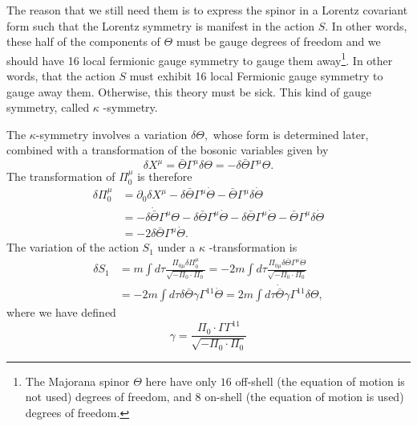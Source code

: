 \documentclass[graybox,envcountchap,sectrefs]{svmono}
\begin{document}
The reason that we still need them is to express the spinor in a Lorentz covariant form such that the Lorentz symmetry is manifest in the action $S$. In other words, these half of the components of $\Theta$ must be gauge degrees of freedom and we should have 16 local fermionic gauge symmetry to gauge them away\footnote{The Majorana spinor $\Theta$ here have only $16$ off-shell (the equation of motion is not used) degrees of freedom, and $8$ on-shell (the equation of motion is used) degrees of freedom.}. 
In other words, that the action $S$ must exhibit 16 local Fermionic gauge symmetry to gauge away them. Otherwise, this theory must be sick.
This kind of gauge symmetry, called $\kappa$ -symmetry.


The $\kappa$-symmetry involves a variation $\delta \Theta,$ whose form is determined later, combined with a transformation of the bosonic variables given by
\begin{equation}
\delta X^{\mu}=\bar{\Theta} \Gamma^{\mu} \delta \Theta=-\delta \bar{\Theta} \Gamma^{\mu} \Theta.
\end{equation}
The transformation of $\Pi_{0}^{\mu}$ is therefore
\begin{equation}
\begin{aligned}
\delta \Pi_{0}^{\mu} &=\partial_{0} \delta X^{\mu}-\delta \bar{\Theta} \Gamma^{\mu} \dot{\Theta}-\bar{\Theta} \Gamma^{\mu} \delta \dot{\Theta} \\
&=-\delta \dot{\bar{\Theta}} \Gamma^{\mu} \Theta-\delta \bar{\Theta} \Gamma^{\mu} \dot{\Theta}-\delta \bar{\Theta} \Gamma^{\mu} \dot{\Theta}-\bar{\Theta} \Gamma^{\mu} \delta \dot{\Theta} \\
&=-2 \delta \bar{\Theta} \Gamma^{\mu} \dot{\Theta}.
\end{aligned}
\end{equation}
The variation of the action $S_{1}$ under a $\kappa$ -transformation is
\begin{equation}
\begin{aligned}
\delta S_{1} &=m \int d \tau \frac{\Pi_{0 \mu} \delta \Pi_{0}^{\mu}}{\sqrt{-\Pi_{0} \cdot \Pi_{0}}}=-2 m \int d \tau \frac{\Pi_{0 \mu} \delta \bar{\Theta} \Gamma^{\mu} \dot{\Theta}}{\sqrt{-\Pi_{0} \cdot \Pi_{0}}} \\
&=-2 m \int d \tau \delta \bar{\Theta} \gamma \Gamma^{11} \dot{\Theta}=2m\int d\tau \dot{\bar{\Theta}}\gamma \Gamma^{11}\delta\Theta,
\end{aligned}
\end{equation}
where we have defined
\begin{equation}
\gamma=\frac{\Pi_{0} \cdot \Gamma \Gamma^{11}}{\sqrt{-\Pi_{0} \cdot \Pi_{0}}}
\end{equation}
\end{document}
